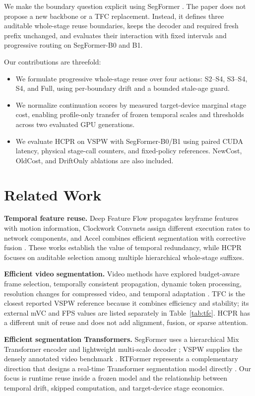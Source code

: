 \documentclass[runningheads]{llncs}
\begin{document}
We make the boundary question explicit using SegFormer \cite{xie2021segformer}. The paper does not propose a new backbone or a TFC replacement. Instead, it defines three auditable whole-stage reuse boundaries, keeps the decoder and required fresh prefix unchanged, and evaluates their interaction with fixed intervals and progressive routing on SegFormer-B0 and B1.

Our contributions are threefold:
\begin{itemize}
\item We formulate progressive whole-stage reuse over four actions: S2--S4, S3--S4, S4, and Full, using per-boundary drift and a bounded stale-age guard.
\item We normalize continuation scores by measured target-device marginal stage cost, enabling profile-only transfer of frozen temporal scales and thresholds across two evaluated GPU generations.
\item We evaluate HCPR on VSPW with SegFormer-B0/B1 using paired CUDA latency, physical stage-call counters, and fixed-policy references. NewCost, OldCost, and DriftOnly ablations are also included.
\end{itemize}

\section{Related Work}
\textbf{Temporal feature reuse.} Deep Feature Flow propagates keyframe features with motion information, Clockwork Convnets assign different execution rates to network components, and Accel combines efficient segmentation with corrective fusion \cite{zhu2017dff,shelhamer2016clockwork,jain2019accel}. These works establish the value of temporal redundancy, while HCPR focuses on auditable selection among multiple hierarchical whole-stage suffixes.

\textbf{Efficient video segmentation.} Video methods have explored budget-aware frame selection, temporally consistent propagation, dynamic token processing, resolution changes for compressed video, and temporal adaptation \cite{baghbaderani2024bofp,liu2024dovit,hu2023arseg,zhang2022auxadapt}. TFC is the closest reported VSPW reference because it combines efficiency and stability; its external mVC and FPS values are listed separately in Table~\ref{tab:tfc}. HCPR has a different unit of reuse and does not add alignment, fusion, or sparse attention.

\textbf{Efficient segmentation Transformers.} SegFormer uses a hierarchical Mix Transformer encoder and lightweight multi-scale decoder \cite{xie2021segformer}; VSPW supplies the densely annotated video benchmark \cite{miao2021vspw}. RTFormer represents a complementary direction that designs a real-time Transformer segmentation model directly \cite{wang2022rtformer}. Our focus is runtime reuse inside a frozen model and the relationship between temporal drift, skipped computation, and target-device stage economics.
\end{document}
